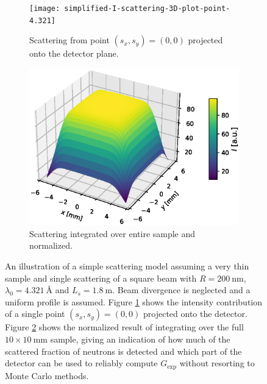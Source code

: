\begin{figure}[htbp]
	\centering
	\begin{subfigure}[b]{0.49\textwidth}
		\centering
		\texttt{[image: simplified-I-scattering-3D-plot-point-4.321]}
		\caption{Scattering from point $(s_x,s_y) = (0,0)$ projected onto the detector plane.}
		\label{fig:simplified-scattering-3D:a}
	\end{subfigure}
	\hfill
	\begin{subfigure}[b]{0.49\textwidth}
		\centering
		\includegraphics[width=\textwidth]{simplified-I-scattering-3D-plot-4.321}
		\caption{Scattering integrated over entire sample and normalized.}
		\label{fig:simplified-scattering-3D:b}
	\end{subfigure}
	\caption{An illustration of a simple scattering model assuming a very thin sample and single scattering of a square beam with $R= \SI{200}{\nano\meter}$, $\lambda_0 =  \SI{4.321}{\angstrom}$ and $L_s = \SI{1.8}{\meter}$. Beam divergence is neglected and a uniform profile is assumed. Figure \ref{fig:simplified-scattering-3D:a} shows the intensity contribution of a single point $(s_x,s_y) = (0,0)$ projected onto the detector. Figure \ref{fig:simplified-scattering-3D:b} shows the normalized result of integrating over the full $10\times10~\unit{\milli\meter}$ sample, giving an indication of how much of the scattered fraction of neutrons is detected and which part of the detector can be used to reliably compute $G_\text{exp}$ without resorting to Monte Carlo methods.}
	\label{fig:simplified-scattering-3D}
\end{figure}
